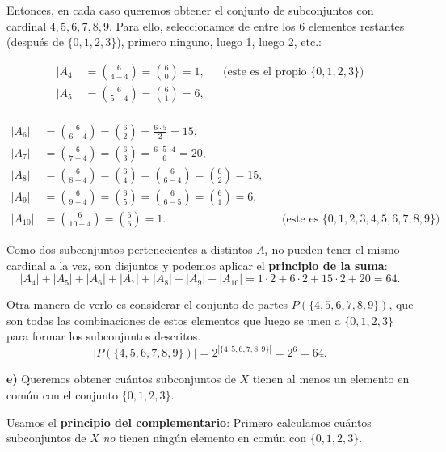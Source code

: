 \documentclass[a4paper,12pt]{article}
\begin{document}
\begin{ejercicio}[title=Ejercicio 15]
\vspace{0.5em}

Entonces, en cada caso queremos obtener el conjunto de subconjuntos con cardinal $4,5,6,7,8,9$.  
Para ello, seleccionamos de entre los 6 elementos restantes (después de $\{0,1,2,3\}$), primero ninguno, luego 1, luego 2, etc.:

\[
\begin{aligned}
|A_4| &= \binom{6}{4-4} = \binom{6}{0} = 1, &&\text{(este es el propio $\{0,1,2,3\}$)}\\[6pt]
|A_5| &= \binom{6}{5-4} = \binom{6}{1} = 6,\\[6pt]
\end{aligned}
\]
\end{ejercicio}
\begin{ejercicio}[title=Ejercicio 15]
\[
\begin{aligned}
|A_6| &= \binom{6}{6-4} = \binom{6}{2} = \frac{6\cdot5}{2} = 15,\\[6pt]
|A_7| &= \binom{6}{7-4} = \binom{6}{3} = \frac{6\cdot5\cdot4}{6} = 20,\\[6pt]
|A_8| &= \binom{6}{8-4} = \binom{6}{4} = \binom{6}{6-4} = \binom{6}{2} = 15,\\[6pt]
|A_9| &= \binom{6}{9-4} = \binom{6}{5} = \binom{6}{6-5} = \binom{6}{1} =6,\\[6pt]
|A_{10}| &= \binom{6}{10-4} = \binom{6}{6} = 1. &&\text{(este es $\{0,1,2,3,4,5,6,7,8,9\}$)}.
\end{aligned}
\]

Como dos subconjuntos pertenecientes a distintos $A_i$ no pueden tener el mismo cardinal a la vez, son disjuntos y podemos aplicar el \textbf{principio de la suma}:
\[
|A_4| + |A_5| + |A_6| + |A_7| + |A_8| + |A_9| + |A_{10}|
= 1\cdot2 + 6\cdot2 + 15\cdot2 + 20
= \boxed{64}.
\]

Otra manera de verlo es considerar el conjunto de partes $P(\{4,5,6,7,8,9\})$, que son todas las combinaciones de estos elementos que luego se unen a $\{0,1,2,3\}$ para formar los subconjuntos descritos.  
\[
|P(\{4,5,6,7,8,9\})| = 2^{|\{4,5,6,7,8,9\}|} = 2^6 = \boxed{64}.
\]

\vspace{0.5em}

\textbf{e)}  
Queremos obtener cuántos subconjuntos de $X$ tienen al menos un elemento en común con el conjunto $\{0,1,2,3\}$.

\vspace{0.5em}

Usamos el \textbf{principio del complementario}:  
Primero calculamos cuántos subconjuntos de $X$ \emph{no} tienen ningún elemento en común con $\{0,1,2,3\}$.  


\end{ejercicio}
\end{document}
